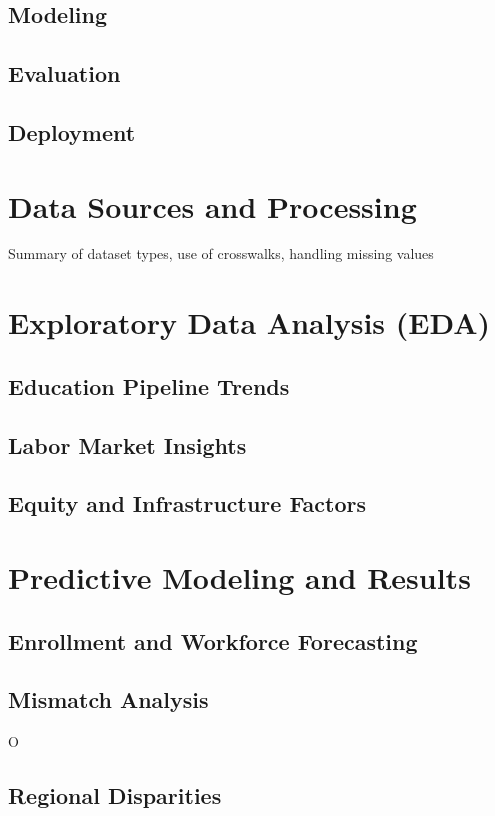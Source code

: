 \documentclass[12pt]{llncs}
\begin{document}
\subsection{Modeling}

\subsection{Evaluation}

\subsection{Deployment}

\section{Data Sources and Processing}
Summary of dataset types, use of crosswalks, handling missing values

\section{Exploratory Data Analysis (EDA)}
\subsection{Education Pipeline Trends}

\subsection{Labor Market Insights}

\subsection{Equity and Infrastructure Factors}


\section{Predictive Modeling and Results}
\subsection{Enrollment and Workforce Forecasting}

\subsection{Mismatch Analysis}
O
\subsection{Regional Disparities}
\end{document}
